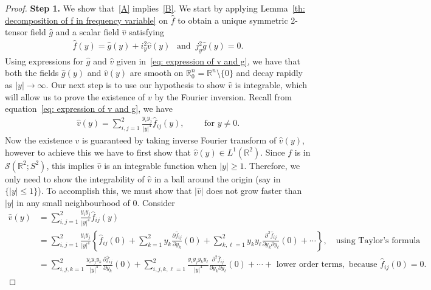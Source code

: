 \documentclass[11pt]{article}
\newcommand{\abs}[1]{\lvert #1 \rvert}
\newcommand{\wh}{\widehat}
\newcommand*\Rn{\mathbb{R}^n}
\newcommand*{\Rt}{\mathbb{R}^2}
\begin{document}
\begin{proof}
\textbf{Step 1.}
We  show that~\ref{A} implies~\ref{B}. We start by applying Lemma~\ref{th: decomposition of f in frequency variable} on $\widehat{f}$ to obtain a unique symmetric 2-tensor field $\widehat{g}$ and a scalar field  $\widehat{v}$ satisfying 
\begin{align}\label{eq:Fourier Decomposition}
\widehat{f}(y)=\widehat{g}(y) + i_{y}^{2}\widehat{v}(y) \ \ \mbox{ and }\    j_{y}^{2} \widehat{g}(y)=0.	\end{align}
Using expressions for $\widehat{g}$ and $\widehat{v}$ given in~\eqref{eq: expression of v and g}, we have that  both the fields $ \widehat{g}(y) $ and $ \widehat{v}(y) $ are smooth on $ \Rn_{0}=\Rn\setminus\{0\} $ and decay rapidly as $|y| \rightarrow \infty$. Our next step is to use our hypothesis to show $ \widehat{v}$ is integrable, which will allow us to prove the existence of $v$ by the Fourier inversion.  Recall from equation~\eqref{eq: expression of v and g}, we have
\begin{align*}
\widehat{v}(y)=  \sum_{i,j=1}^2\frac{y_{i} y_{j}}{|y|^{4}}\widehat{f}_{i j}(y), \qquad \mbox{ for } y \neq 0.
\end{align*}
Now the existence $v$  is guaranteed by taking inverse Fourier transform of  $ \wh{v}(y)$, however to achieve this we have to first show that $\wh{v}(y)\in L^1(\Rt)$.  Since $f$ is in $\mathcal{S}(\mathbb{R}^2;S^2)$, this implies  $\widehat{v}$ is an integrable function when $\abs{y}\ge 1$. Therefore, we only need to show the integrability of $\widehat{v}$ in a ball around the origin (say in $\{|y| \leq 1\}$). To accomplish this, we must show that $|\wh{v}|$ does not grow faster than $|y|$ in any small neighbourhood of $0$. Consider
\begin{align*}
\widehat{v}(y)&=  \sum_{i,j=1}^2\frac{y_{i} y_{j}}{|y|^{4}}\widehat{f}_{i j}(y)\\
&= \sum_{i,j=1}^2 \frac{y_{i} y_{j}}{|y|^{4}}\left\{\widehat{f}_{ij}(0) + \sum_{k=1}^2 y_k \frac{\partial \widehat{f}_{ij}}{\partial y_k} (0) +\sum_{k,\ell=1}^2 y_k y_\ell \frac{\partial^2 \widehat{f}_{ij}}{\partial y_k \partial y_\ell} (0) + \cdots \right\}, \quad  \mbox{using Taylor's formula}\\
&=  \sum_{i,j, k=1}^2 \frac{y_{i} y_{j} y_k}{|y|^{4}} \frac{\partial \widehat{f}_{ij}}{\partial y_k} (0) +  \sum_{i, j, k,\ell=1}^2 \frac{y_{i} y_{j} y_k y_\ell}{|y|^4} \frac{\partial^2 \widehat{f}_{ij}}{\partial y_k \partial y_\ell} (0) + \cdots +  \text{ lower order terms},  \mbox{ because } \widehat{f}_{ij}(0) = 0.

\end{align*}
\end{proof}
\end{document}

